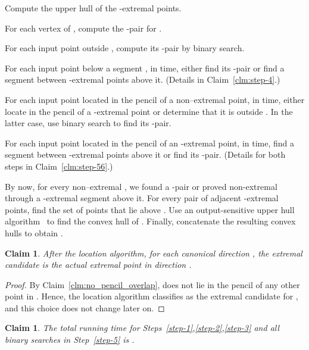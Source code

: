 \documentclass[letterpaper,11pt]{article}
\newtheorem{claim}[theorem]{Claim}
\begin{document}
\begin{asparaenum}
  \item \label{step-1} 
     Compute the upper hull of the 
     -extremal points.
  \item \label{step-2} 
    For each vertex  of , compute the 
    -pair for .
  \item \label{step-3} 
    For each input 
    point  outside , compute 
    its -pair by binary search.
  \item \label{step-4} 
    For each input point  
    below a segment , in 
     time, either find its -pair 
    or find a segment between -extremal
    points above it. (Details in Claim~\ref{clm:step-4}.)
  \item \label{step-5} 
    For each input point 
     located in the pencil 
    of a non--extremal point, 
    in  time, either locate  in the pencil of a 
    -extremal point or determine 
    that it is outside . In 
    the latter case, use binary search to find its
    -pair.
  \item \label{step-6} 
    For each input 
    point  located in the pencil 
    of an -extremal point, in  
    time, find a segment between -extremal 
    points above it or find its 
    -pair. (Details for 
    both steps in Claim~\ref{clm:step-56}.)
  \item \label{step-7} 
    By now, for every 
    non--extremal , 
    we found a -pair or proved 
     non-extremal through a -extremal 
    segment above it.  For every pair 
     of adjacent -extremal 
    points, find the set  of points
    that lie above . 
    Use an output-sensitive 
    upper hull algorithm~\cite{KirkpatrickSe86} to find the convex 
    hull of . Finally, concatenate the resulting 
    convex hulls to obtain . 
\end{asparaenum}

\begin{claim} \label{clm:ext-cand} 
  After the location algorithm, for each
  canonical direction , the extremal candidate 
   is the
  actual extremal point  in direction .  
\end{claim}

\begin{proof} 
By Claim~\ref{clm:no_pencil_overlap}, 
 does not lie in the pencil of any other
point in . Hence, the location algorithm 
classifies  as the extremal candidate for 
, and this choice does 
not change later on.
\end{proof}


\begin{claim} \label{clm:step-123} 
  The total running time for 
  Steps~\ref{step-1},\ref{step-2},\ref{step-3}
  and all binary searches in 
  Step~\ref{step-5} is .
\end{claim}
\end{document}

